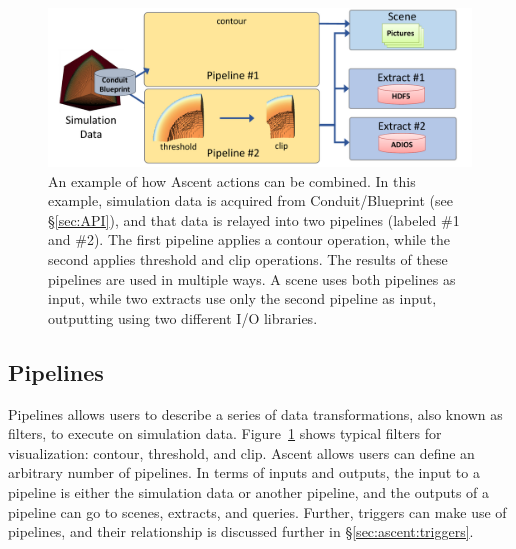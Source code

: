\begin{figure}
\centering
\includegraphics[width=\textwidth]{images/ascent_actions_diagram.pdf}
\caption{\label{fig:ascent_example} An example of how Ascent actions can be combined.
In this example, simulation data is acquired from Conduit/Blueprint (see \S\ref{sec:API}),
and that data is relayed into two pipelines (labeled \#1 and \#2). 
The first pipeline applies a contour operation, while the second
applies threshold and clip operations.
%
The results of these pipelines are used in multiple ways.
A scene uses both pipelines as input, while two extracts use only the second pipeline
as input, outputting using two different I/O libraries.}
\end{figure}



\subsection{Pipelines}

Pipelines allows users to describe a series of data transformations, also known as filters,
to execute on simulation data.
%
Figure~\ref{fig:ascent_example} shows
typical filters for visualization: contour, threshold, and clip.
%
Ascent allows users can define an arbitrary number of pipelines.
%
In terms of inputs and outputs, the input to a pipeline is either
the simulation data or another pipeline, and the outputs of a pipeline
can go to scenes, extracts, and queries.  
%
Further, triggers can make use of pipelines, and their relationship is discussed further
in \S\ref{sec:ascent:triggers}.

